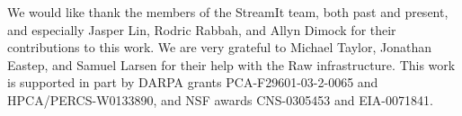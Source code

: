 \acks 
We would like thank the members of the StreamIt team, both past and
present, and especially Jasper Lin, Rodric Rabbah, and Allyn Dimock
for their contributions to this work.  We are very grateful to Michael
Taylor, Jonathan Eastep, and Samuel Larsen for their help with the Raw
infrastructure.  This work is supported in part by DARPA grants
PCA-F29601-03-2-0065 and HPCA/PERCS-W0133890, and NSF awards
CNS-0305453 and EIA-0071841.
